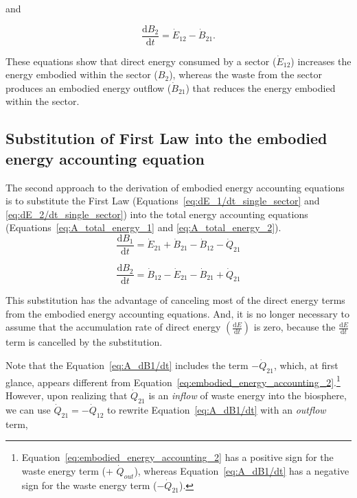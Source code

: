 \noindent and

\begin{equation} \label{eq:A_total_energy_2_simp}
	\frac{\mathrm{d}B_{2}}{\mathrm{d}t} 
	= \dot{E}_{12} 
	- \dot{B}_{21}.	
\end{equation}

These equations show that direct energy consumed by a 
sector ($\dot{E}_{12}$) increases the energy embodied within the sector ($B_2$), 
whereas the waste from the sector produces an embodied
energy outflow ($\dot{B}_{21}$) that reduces 
the energy embodied within the sector. 



\subsection{Substitution of First Law into the embodied energy accounting equation} %
\label{subsec:A_first_law_embodied}

The second approach to the derivation of embodied energy
accounting equations is to substitute the First Law
(Equations~\ref{eq:dE_1/dt_single_sector} and \ref{eq:dE_2/dt_single_sector}) 
into the total energy accounting equations 
(Equations~\ref{eq:A_total_energy_1} and \ref{eq:A_total_energy_2}). 
\begin{equation} \label{eq:A_dB1/dt}
	\frac{\mathrm{d}B_{1}}{\mathrm{d}t} 
	= \dot{E}_{21}
	+ \dot{B}_{21} 
	- \dot{B}_{12}
	- \dot{Q}_{21}
\end{equation}

\begin{equation} \label{eq:A_dB2/dt}
	\frac{\mathrm{d}B_{2}}{\mathrm{d}t} 
	= \dot{B}_{12} 
	- \dot{E}_{21}
	- \dot{B}_{21}
	+ \dot{Q}_{21}
\end{equation}

This substitution has the advantage of canceling most 
of the direct energy terms from the embodied energy accounting equations.
And, it is no longer necessary to assume that the 
accumulation rate of direct energy 
$\left( \frac{\mathrm{d}E}{\mathrm{d}t} \right)$
is zero, because the 
$\frac{\mathrm{d}E}{\mathrm{d}t}$
term is cancelled by the substitution.

Note that the Equation~\ref{eq:A_dB1/dt} includes the
term $-\dot{Q}_{21}$, which, at first glance,
appears different from 
Equation~\ref{eq:embodied_energy_accounting_2}.\footnote{Equation~\ref{eq:embodied_energy_accounting_2}
has a positive sign for the waste energy term (+ $\dot{Q}_{out}$),
whereas Equation~\ref{eq:A_dB1/dt} has a 
negative sign for the waste energy term ($- \dot{Q}_{21}$).}
However, upon realizing that $\dot{Q}_{21}$ is an \emph{inflow}
of waste energy into the biosphere, we can use $\dot{Q}_{21} = - \dot{Q}_{12}$
to rewrite Equation~\ref{eq:A_dB1/dt} with an \emph{outflow} 
term,

